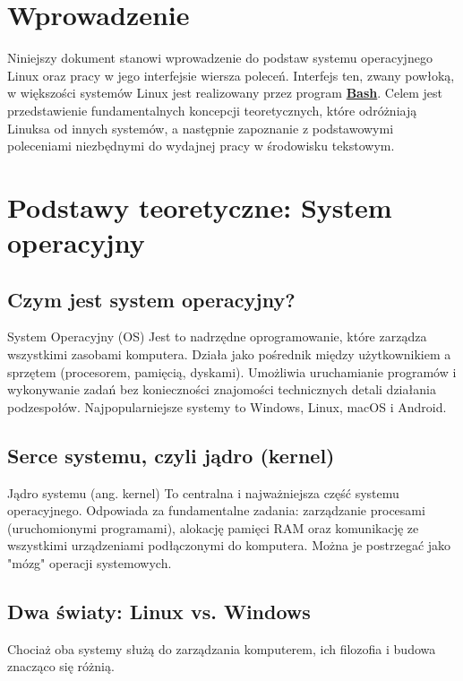 \section*{Wprowadzenie}
Niniejszy dokument stanowi wprowadzenie do podstaw systemu operacyjnego Linux oraz pracy w jego interfejsie wiersza poleceń. Interfejs ten, zwany powłoką, w większości systemów Linux jest realizowany przez program \href{https://www.gnu.org/software/bash/}{\textbf{Bash}}. Celem jest przedstawienie fundamentalnych koncepcji teoretycznych, które odróżniają Linuksa od innych systemów, a następnie zapoznanie z podstawowymi poleceniami niezbędnymi do wydajnej pracy w środowisku tekstowym.

\section{Podstawy teoretyczne: System operacyjny}
\subsection{Czym jest system operacyjny?}
\begin{definitionbox}{System Operacyjny (OS)}
Jest to nadrzędne oprogramowanie, które zarządza wszystkimi zasobami komputera. Działa jako pośrednik między użytkownikiem a sprzętem (procesorem, pamięcią, dyskami). Umożliwia uruchamianie programów i wykonywanie zadań bez konieczności znajomości technicznych detali działania podzespołów. Najpopularniejsze systemy to Windows, Linux, macOS i Android.
\end{definitionbox}

\subsection{Serce systemu, czyli jądro (kernel)}
\begin{definitionbox}{Jądro systemu (ang. kernel)}
To centralna i najważniejsza część systemu operacyjnego. Odpowiada za fundamentalne zadania: zarządzanie procesami (uruchomionymi programami), alokację pamięci RAM oraz komunikację ze wszystkimi urządzeniami podłączonymi do komputera. Można je postrzegać jako "mózg" operacji systemowych.
\end{definitionbox}

\subsection{Dwa światy: Linux vs. Windows}
Chociaż oba systemy służą do zarządzania komputerem, ich filozofia i budowa znacząco się różnią.

